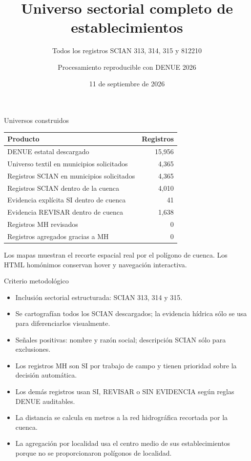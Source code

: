 \documentclass[aspectratio=169]{beamer}
\title{Universo sectorial completo de establecimientos}
\subtitle{Todos los registros SCIAN 313, 314, 315 y 812210}
\author{Procesamiento reproducible con DENUE 2026}
\date{11 de septiembre de 2026}
\begin{document}
\begin{frame}\titlepage\end{frame}
\begin{frame}{Universos construidos}
\centering
\begin{tabular}{lr}\toprule
Producto & Registros\\\midrule
DENUE estatal descargado & 15,956\\
Universo textil en municipios solicitados & 4,365\\
Registros SCIAN en municipios solicitados & 4,365\\
Registros SCIAN dentro de la cuenca & 4,010\\
Evidencia explícita SI dentro de cuenca & 41\\
Evidencia REVISAR dentro de cuenca & 1,638\\
Registros MH revisados & 0\\
Registros agregados gracias a MH & 0\\
\bottomrule\end{tabular}
\vfill
Los mapas muestran el recorte espacial real por el polígono de cuenca. Los HTML homónimos conservan hover y navegación interactiva.
\end{frame}
\begin{frame}{Criterio metodológico}
\begin{itemize}
\item Inclusión sectorial estructurada: SCIAN 313, 314 y 315.
\item Se cartografían todos los SCIAN descargados; la evidencia hídrica sólo se usa para diferenciarlos visualmente.
\item Señales positivas: nombre y razón social; descripción SCIAN sólo para exclusiones.
\item Los registros MH son SI por trabajo de campo y tienen prioridad sobre la decisión automática.
\item Los demás registros usan SI, REVISAR o SIN EVIDENCIA según reglas DENUE auditables.
\item La distancia se calcula en metros a la red hidrográfica recortada por la cuenca.
\item La agregación por localidad usa el centro medio de sus establecimientos porque no se proporcionaron polígonos de localidad.
\end{itemize}
\end{frame}
\end{document}
